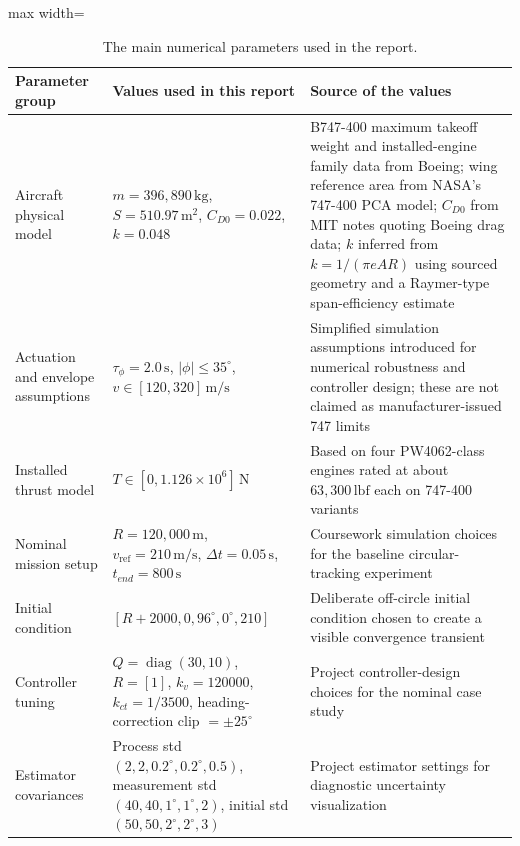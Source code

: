 \documentclass{Academic}
\begin{document}
\begin{table}[!htb]
\centering
\caption{The main numerical parameters used in the report.}
\label{tab:param-provenance}
\small
\setlength{\tabcolsep}{4pt}
\renewcommand{\arraystretch}{1.02}
\begin{adjustbox}{max width=\textwidth}
\begin{tabular}{@{}>{\raggedright\arraybackslash}p{} >{\raggedright\arraybackslash}p{} >{\raggedright\arraybackslash}p{}@{}}
\toprule
Parameter group & Values used in this report & Source of the values \\
\midrule
Aircraft physical model & \(m=396{,}890\,\mathrm{kg}\), \(S=510.97\,\mathrm{m}^2\), \(C_{D0}=0.022\), \(k=0.048\) & B747-400 maximum takeoff weight and installed-engine family data from Boeing; wing reference area from NASA's 747-400 PCA model; \(C_{D0}\) from MIT notes quoting Boeing drag data; \(k\) inferred from \(k=1/(\pi e AR)\) using sourced geometry and a Raymer-type span-efficiency estimate \supercite{boeing747400,burken1997,mahajan2014,raymer2018} \\
Actuation and envelope assumptions & \(\tau_\phi=2.0\,\mathrm{s}\), \(|\phi|\le35^\circ\), \(v\in[120,320]\,\mathrm{m/s}\) & Simplified simulation assumptions introduced for numerical robustness and controller design; these are not claimed as manufacturer-issued 747 limits \\
Installed thrust model & \(T\in[0,1.126\times10^6]\,\mathrm{N}\) & Based on four PW4062-class engines rated at about \(63{,}300\,\mathrm{lbf}\) each on 747-400 variants \supercite{boeing747400,pw400094guide} \\
Nominal mission setup & \(R=120{,}000\,\mathrm{m}\), \(v_{\mathrm{ref}}=210\,\mathrm{m/s}\), \(\Delta t=0.05\,\mathrm{s}\), \(t_{end}=800\,\mathrm{s}\) & Coursework simulation choices for the baseline circular-tracking experiment \\
Initial condition & \([R+2000,0,96^\circ,0^\circ,210]\) & Deliberate off-circle initial condition chosen to create a visible convergence transient \\
Controller tuning & \(Q=\operatorname{diag}(30,10)\), \(R=[1]\), \(k_v=120000\), \(k_{ct}=1/3500\), heading-correction clip \(=\pm25^\circ\) & Project controller-design choices for the nominal case study \\
Estimator covariances & Process std \((2,2,0.2^\circ,0.2^\circ,0.5)\), measurement std \((40,40,1^\circ,1^\circ,2)\), initial std \((50,50,2^\circ,2^\circ,3)\) & Project estimator settings for diagnostic uncertainty visualization \\

\end{tabular}
\end{adjustbox}
\end{table}
\end{document}
